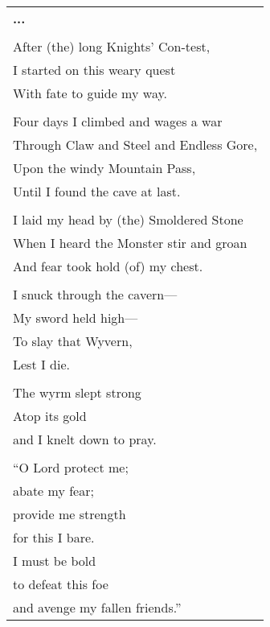 \documentclass{article}
\begin{document}



\begin{center}
\begin{tabular}{l}
\textbf{...} \\
\\
After (the) long Knights' Con-test, \\
I started on this weary quest \\
With fate to guide my way. \\
\\
Four days I climbed and wages a war \\
Through Claw and Steel and Endless Gore, \\
Upon the windy Mountain Pass, \\
Until I found the cave at last. \\
\\
I laid my head by (the) Smoldered Stone \\
When I heard the Monster stir and groan \\
And fear took hold (of) my chest. \\
\\
I snuck through the cavern--- \\
My sword held high--- \\
To slay that Wyvern, \\
Lest I die. \\
\\
The wyrm slept strong \\
Atop its gold \\
and I knelt down to pray. \\
\\
``O Lord protect me; \\
abate my fear; \\
provide me strength \\
for this I bare. \\
I must be bold \\
to defeat this foe \\
and avenge my fallen friends.'' \\

\end{tabular}
\end{center}
\end{document}
